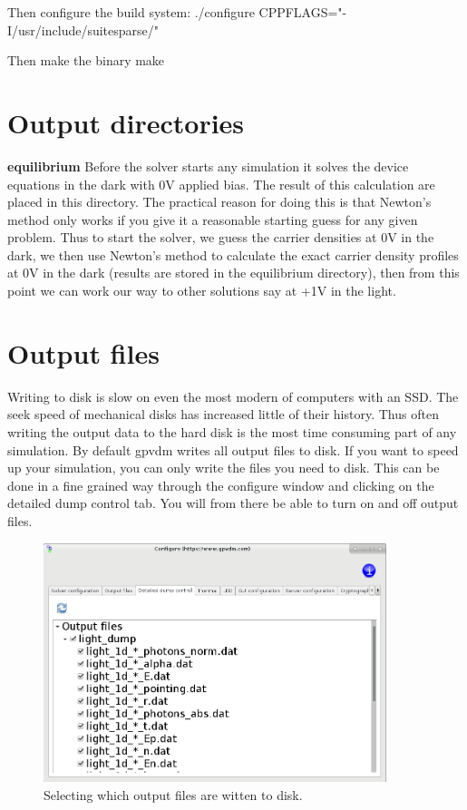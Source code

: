 \documentclass[11pt]{article}
\begin{document}
Then configure the build system:\newline
./configure CPPFLAGS="-I/usr/include/suitesparse/"\newline

Then make the binary\newline
make\newline



\appendix
{}
\section{Output directories}
\textbf{equilibrium}\newline
Before the solver starts any simulation it solves the device equations in the dark with 0V applied bias.  The result of this calculation are placed in this directory.  The practical reason for doing this is that Newton's method only works if you give it a reasonable starting guess for any given problem.  Thus to start the solver, we guess the carrier densities at 0V in the dark, we then use Newton's method to calculate the exact carrier density profiles at 0V in the dark (results are stored in the equilibrium directory), then from this point we can work our way to other solutions say at +1V in the light.
\newline

\section{Output files}
Writing to disk is slow on even the most modern of computers with an SSD.  The seek speed of mechanical disks has increased little of their history.  Thus often writing the output data to the hard disk is the most time consuming part of any simulation.  By default gpvdm writes all output files to disk.  If you want to speed up your simulation, you can only write the files you need to disk.  This can be done in a fine grained way through the configure window and clicking on the detailed dump control tab.  You will from there be able to turn on and off output files.

\begin{figure}
\centering
\includegraphics[width=100mm]{./images/output_files.png}
\caption{Selecting which output files are witten to disk.}
\end{figure}


\end{document}
